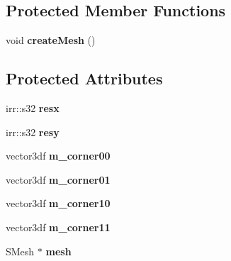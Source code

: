 \subsection*{Protected Member Functions}
\begin{DoxyCompactItemize}
\item 
\hypertarget{class_c_irr_b_p_patch_soft_body_a6f4d0d78aef0195f5a57f28f55b0059b}{
void {\bfseries createMesh} ()}
\label{class_c_irr_b_p_patch_soft_body_a6f4d0d78aef0195f5a57f28f55b0059b}

\end{DoxyCompactItemize}
\subsection*{Protected Attributes}
\begin{DoxyCompactItemize}
\item 
\hypertarget{class_c_irr_b_p_patch_soft_body_a613a22f6594818112fdfada2aeba0a15}{
irr::s32 {\bfseries resx}}
\label{class_c_irr_b_p_patch_soft_body_a613a22f6594818112fdfada2aeba0a15}

\item 
\hypertarget{class_c_irr_b_p_patch_soft_body_ad3911381c0672d89ed90c94d358184e8}{
irr::s32 {\bfseries resy}}
\label{class_c_irr_b_p_patch_soft_body_ad3911381c0672d89ed90c94d358184e8}

\item 
\hypertarget{class_c_irr_b_p_patch_soft_body_a988eda4811d0aec37efd60664f68356b}{
vector3df {\bfseries m\_\-corner00}}
\label{class_c_irr_b_p_patch_soft_body_a988eda4811d0aec37efd60664f68356b}

\item 
\hypertarget{class_c_irr_b_p_patch_soft_body_a98275d633d430587981f6f9dde9486db}{
vector3df {\bfseries m\_\-corner01}}
\label{class_c_irr_b_p_patch_soft_body_a98275d633d430587981f6f9dde9486db}

\item 
\hypertarget{class_c_irr_b_p_patch_soft_body_a9449c80186f63bb9e8ea6ae1335d5163}{
vector3df {\bfseries m\_\-corner10}}
\label{class_c_irr_b_p_patch_soft_body_a9449c80186f63bb9e8ea6ae1335d5163}

\item 
\hypertarget{class_c_irr_b_p_patch_soft_body_a7ddaf495cdafdaa1c8bb9a925a36b9a0}{
vector3df {\bfseries m\_\-corner11}}
\label{class_c_irr_b_p_patch_soft_body_a7ddaf495cdafdaa1c8bb9a925a36b9a0}

\item 
\hypertarget{class_c_irr_b_p_patch_soft_body_a7795810afc28161780cd138e93ddb4e0}{
SMesh $\ast$ {\bfseries mesh}}
\label{class_c_irr_b_p_patch_soft_body_a7795810afc28161780cd138e93ddb4e0}


\end{DoxyCompactItemize}
